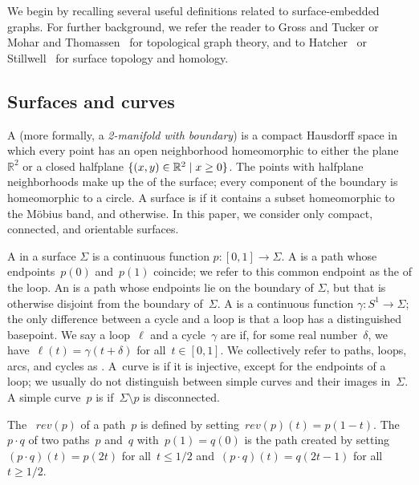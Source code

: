 \documentclass[letterpaper,review]{siamart190516}
\def\rev{\mathit{rev}}
\def\Real{\mathbb{R}}
\def\anote#1{\color{purple}Amir: #1 \color{black}}
\begin{document}


We begin by recalling several useful definitions related to surface-embedded graphs.  For further background, we refer the reader to Gross and Tucker \cite{gt-tgt-01} or Mohar and Thomassen~\cite{mt-gs-01} for topological graph theory, and to Hatcher~\cite{h-at-02} or Stillwell~\cite{s-ctcgt-93} for surface topology and homology.


\subsection{Surfaces and curves}
\label{SS:surfaces}

A  (more formally, a \emph{2-manifold with boundary}) is a compact Hausdorff space in which every point has an open neighborhood homeomorphic to either the plane $\Real^2$ or a closed halfplane $\set{(x,y)\in \Real^2\mid x\ge 0}$.  The points with halfplane neighborhoods make up the  of the surface; every component of the boundary is homeomorphic to a circle.
A surface is  if it contains a subset homeomorphic to
the M\"obius band, and  otherwise. In this paper, we consider only compact, connected, and orientable surfaces.

A  in a surface $\Sigma$ is a continuous function $p\colon [0,1]\to\Sigma$.
A  is a path whose endpoints~$p(0)$ and~$p(1)$ coincide;
we refer to this common endpoint as the  of the loop.
An  is a path whose endpoints lie on the boundary of $\Sigma$, but that is otherwise disjoint from the boundary of~$\Sigma$.
A  is a continuous function $\gamma\colon S^1\to\Sigma$;
the only difference between a cycle and a loop is that a loop has a
distinguished basepoint.
We say a loop~$\ell$ and a cycle~$\gamma$ are  if, for some
real number~$\delta$, we have~$\ell(t) = \gamma(t + \delta)$ for
all~$t \in [0,1]$.
We collectively refer to paths, loops, arcs, and cycles as .
A~curve is  if it is injective, except for the endpoints of a loop; we usually do not distinguish between simple curves and their images in~$\Sigma$.
A simple curve~$p$ is  if~$\Sigma \setminus p$ is disconnected.

The ~$\rev(p)$ of a path~$p$ is defined by
setting~$\rev(p)(t) = p(1-t)$. The ~$p \cdot q$ of two
paths~$p$ and~$q$ with~$p(1)=q(0)$ is the path created by
setting~$(p\cdot q)(t) = p(2t)$ for all~$t \leq 1/2$
and~$(p\cdot q)(t) = q(2t-1)$ for all~$t \geq 1/2$.
\end{document}
